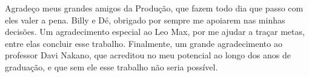 \begin{agradecimentos}

Agradeço meus grandes amigos da Produção, que fazem todo dia que passo com eles valer a pena. Billy e Dé, obrigado por sempre me apoiarem nas minhas decisões. Um agradecimento especial ao Leo Max, por me ajudar a traçar metas, entre elas concluir esse trabalho. Finalmente, um grande agradecimento ao professor Davi Nakano, que acreditou no meu potencial ao longo dos anos de graduação, e que sem ele esse trabalho não seria possível.

\end{agradecimentos}